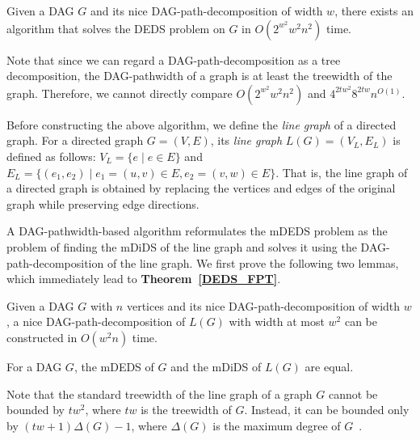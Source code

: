 \documentclass[runningheads]{llncs}
\theoremstyle{plain}
\theoremstyle{definition}
\begin{document}
\begin{theorem}\label{DEDS_FPT}
    Given a DAG \(G\) and its nice DAG-path-decomposition of width \(w\), there exists an algorithm that solves the DEDS problem on \(G\) in \(O(2^{w^2} w^2 n^2)\) time.  
\end{theorem}
%
Note that since we can regard a DAG-path-decomposition as a tree decomposition, the DAG-pathwidth of a graph is at least the treewidth of the graph. Therefore, we cannot directly compare \(O(2^{w^2} w^2 n^2)\) and \(4^{2tw^2} 8^{2tw} n^{O(1)}\).

Before constructing the above algorithm, we define the \emph{line graph} of a directed graph.  
For a directed graph \(G = (V, E)\), its \emph{line graph} \(L(G) = (V_L, E_L)\) is defined as follows:  
\(V_L = \{e \mid e \in E\}\) and \(E_L = \{(e_1, e_2) \mid e_1 = (u, v) \in E, e_2 = (v, w) \in E\}\).  
That is, the line graph of a directed graph is obtained by replacing the vertices and edges of the original graph while preserving edge directions.  

A DAG-pathwidth-based algorithm reformulates the mDEDS problem as the problem of finding the mDiDS of the line graph and solves it using the DAG-path-decomposition of the line graph.  
We first prove the following two lemmas, which immediately lead to \textbf{Theorem~\ref{DEDS_FPT}}.  

\begin{lemma}\label{DAG_path_decomposition(L(G))}
    Given a DAG \(G\) with \(n\) vertices and its nice DAG-path-decomposition of width \(w\), a nice DAG-path-decomposition of \(L(G)\) with width at most \(w^2\) can be constructed in \(O(w^2 n)\) time.  
\end{lemma}

\begin{lemma}\label{mDEDS_mDiDS}
    For a DAG \(G\), the mDEDS of \(G\) and the mDiDS of \(L(G)\) are equal.  
\end{lemma}

Note that the standard treewidth of the line graph of a graph $G$ cannot be bounded by $tw^2$, where $tw$ is the treewidth of $G$. Instead, it can be bounded only by $(tw + 1) \Delta(G) - 1$, where $\Delta(G)$ is the maximum degree of $G$~\cite{xxxxxxxxxxxxxxx}.
\end{document}
